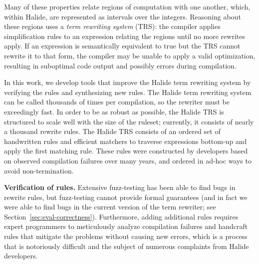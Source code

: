 \documentclass[acmsmall,review,anonymous]{acmart}\settopmatter{printfolios=true,printccs=false,printacmref=false}
\begin{document}
Many of these properties relate regions of computation with one another,
which, within Halide, are represented as intervals over the integers.
Reasoning about these regions uses a \textit{term rewriting system}
(TRS): the compiler applies simplification rules to an expression relating
the regions until no more rewrites apply.  
If an expression is semantically equivalent to true
but the TRS cannot rewrite it to that form, the compiler may be unable to apply a valid optimization,
resulting in suboptimal code output and possibly errors during compilation.

In this work, we develop tools that improve the Halide term rewriting system by
verifying  the rules and synthesizing new rules.  The Halide term rewriting
system can be called thousands of times per compilation, so the rewriter must be
exceedingly fast.  In order to be as robust  as possible, the Halide TRS is
structured to scale well with the size of the ruleset; currently, it consists of
nearly a thousand rewrite rules. The Halide TRS consists of an ordered set of 
handwritten rules and efficient matchers to traverse expressions bottom-up and
apply the first matching rule. These rules were constructed
by developers based on observed compilation failures over many years, and
ordered in ad-hoc ways to avoid non-termination. 

\textbf{Verification of rules.}
Extensive
fuzz-testing has been able to find bugs in rewrite rules, but fuzz-testing
cannot provide formal guarantees (and in fact we were able to find bugs in the
current version of the term rewriter; see Section~\ref{sec:eval-correctness}).
Furthermore, adding additional rules requires expert programmers to meticulously
analyze compilation failures and handcraft rules that mitigate the problems
without causing new errors, which is a process that is notoriously difficult and
the subject of numerous complaints from Halide developers.


%
\end{document}
